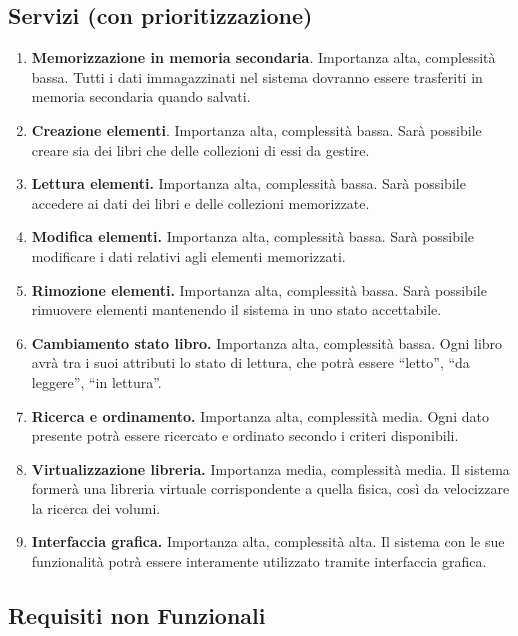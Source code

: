 \subsection{Servizi (con prioritizzazione)}

\begin{enumerate}
  \item
    \textbf{Memorizzazione in memoria secondaria}. Importanza alta,
    complessità bassa. Tutti i dati immagazzinati nel sistema dovranno
    essere trasferiti in memoria secondaria quando salvati.
  \item
    \textbf{Creazione elementi}. Importanza alta, complessità bassa. Sarà
    possibile creare sia dei libri che delle collezioni di essi da
    gestire.
  \item
    \textbf{Lettura elementi.} Importanza alta, complessità bassa. Sarà
    possibile accedere ai dati dei libri e delle collezioni memorizzate.
  \item
    \textbf{Modifica elementi.} Importanza alta, complessità bassa. Sarà
    possibile modificare i dati relativi agli elementi memorizzati.
  \item
    \textbf{Rimozione elementi.} Importanza alta, complessità bassa. Sarà
    possibile rimuovere elementi mantenendo il sistema in uno stato
    accettabile.
  \item
    \textbf{Cambiamento stato libro.} Importanza alta, complessità bassa.
    Ogni libro avrà tra i suoi attributi lo stato di lettura, che potrà
    essere ``letto'', ``da leggere'', ``in lettura''.
  \item
    \textbf{Ricerca e ordinamento.} Importanza alta, complessità media.
    Ogni dato presente potrà essere ricercato e ordinato secondo i criteri
    disponibili.
  \item
    \textbf{Virtualizzazione libreria.} Importanza media, complessità
    media. Il sistema formerà una libreria virtuale corrispondente a
    quella fisica, così da velocizzare la ricerca dei volumi.
  \item
    \textbf{Interfaccia grafica.} Importanza alta, complessità alta. Il
    sistema con le sue funzionalità potrà essere interamente utilizzato
    tramite interfaccia grafica.
\end{enumerate}

\subsection{Requisiti non Funzionali}

